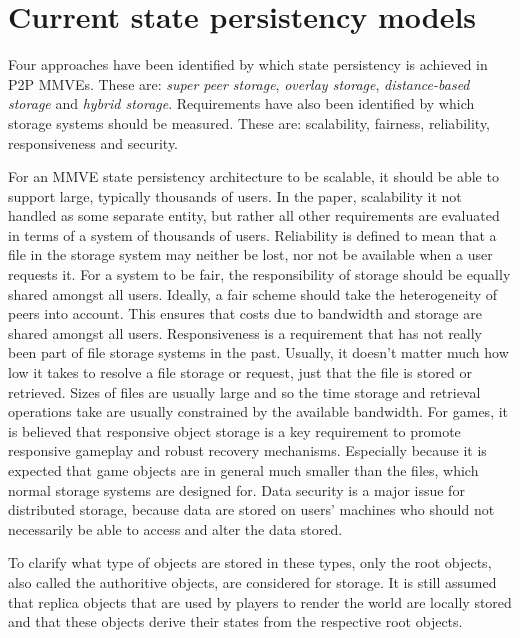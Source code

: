 \documentclass[10pt,a4paper,conference]{IEEEtran}
\begin{document}
\section{Current state persistency models}
\label{current_models}

Four approaches have been identified by which state persistency is achieved in P2P MMVEs. These are: \emph{super peer storage}, \emph{overlay
storage}, \emph{distance-based storage} and \emph{hybrid storage}. Requirements have also been identified by which storage systems should be
measured. These are: scalability, fairness, reliability, responsiveness and security.

For an MMVE state persistency architecture to be scalable, it should be able to support large, typically thousands of users. In the paper,
scalability it not handled as some separate entity, but rather all other requirements are evaluated in terms of a system of thousands of users.
Reliability is defined to mean that a file in the storage system may neither be lost, nor not be available when a user requests it.
For a system to be fair, the responsibility of storage should be equally shared amongst all users. Ideally, a fair scheme should take the
heterogeneity of peers into account. This ensures that costs due to bandwidth and storage are shared amongst all users.
Responsiveness is a requirement that has not really been part of file storage systems in the past. Usually, it doesn't matter much how low it takes
to resolve a file storage or request, just that the file is stored or retrieved. Sizes of files are usually large and so the time storage and
retrieval operations take are usually constrained by the available bandwidth. For games, it is believed that responsive object storage is a key
requirement to promote responsive gameplay and robust recovery mechanisms. Especially because it is expected that game objects are in general much
smaller than the files, which normal storage systems are designed for.
Data security is a major issue for distributed storage, because data are stored on users' machines who should not necessarily be able to access and
alter the data stored.

To clarify what type of objects are stored in these types, only the root objects, also called the authoritive objects, are considered for storage. It
is still assumed that replica objects that are used by players to render the world are locally stored and that these objects derive their states from
the respective root objects.
\end{document}
